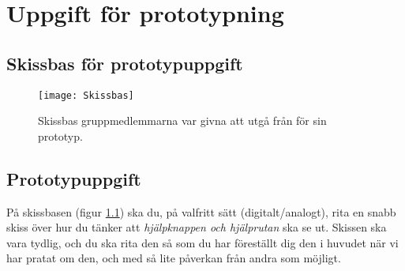 \chapter{\hspace{2.6em} Uppgift för prototypning}
\label{cha:gruppens_skisser}

\section{Skissbas för prototypuppgift}
\label{sec:skissbas}
\begin{figure}[H]
  \centering
  \texttt{[image: Skissbas]}
  \caption{Skissbas gruppmedlemmarna var givna att utgå från för sin prototyp.}
  \label{fig:skissbas}
\end{figure}

\section{Prototypuppgift}
\label{sec:prototype-exercise}
På skissbasen (figur \ref{fig:skissbas}) ska du, på valfritt sätt (digitalt/analogt), rita en snabb skiss över hur du tänker att \textit{hjälpknappen och hjälprutan} ska se ut. Skissen ska vara tydlig, och du ska rita den så som du har föreställt dig den i huvudet när vi har pratat om den, och med så lite påverkan från andra som möjligt. 

